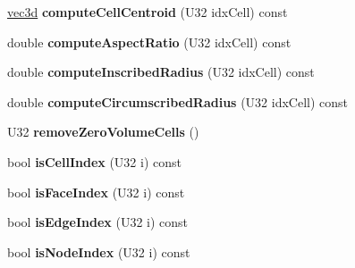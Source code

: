 \begin{DoxyCompactItemize}
\item 
\hypertarget{classps_1_1elastic_1_1VolMesh_af88b84f3c6a36015fd4d1b5b60a4f4b4}{}\hyperlink{classps_1_1base_1_1Vec3}{vec3d} {\bfseries compute\+Cell\+Centroid} (U32 idx\+Cell) const \label{classps_1_1elastic_1_1VolMesh_af88b84f3c6a36015fd4d1b5b60a4f4b4}

\item 
\hypertarget{classps_1_1elastic_1_1VolMesh_a799683f49aec6c0e6e70bc68f5e8a0b0}{}double {\bfseries compute\+Aspect\+Ratio} (U32 idx\+Cell) const \label{classps_1_1elastic_1_1VolMesh_a799683f49aec6c0e6e70bc68f5e8a0b0}

\item 
\hypertarget{classps_1_1elastic_1_1VolMesh_a1194410e557361559a0eb7ebde0270ee}{}double {\bfseries compute\+Inscribed\+Radius} (U32 idx\+Cell) const \label{classps_1_1elastic_1_1VolMesh_a1194410e557361559a0eb7ebde0270ee}

\item 
\hypertarget{classps_1_1elastic_1_1VolMesh_a9fdeddee8f948341861529a085be4299}{}double {\bfseries compute\+Circumscribed\+Radius} (U32 idx\+Cell) const \label{classps_1_1elastic_1_1VolMesh_a9fdeddee8f948341861529a085be4299}

\item 
\hypertarget{classps_1_1elastic_1_1VolMesh_a5f67ac6f5c6f41fb6e5725f34b94a333}{}U32 {\bfseries remove\+Zero\+Volume\+Cells} ()\label{classps_1_1elastic_1_1VolMesh_a5f67ac6f5c6f41fb6e5725f34b94a333}

\item 
\hypertarget{classps_1_1elastic_1_1VolMesh_adaf7ed1e46557f71b6d0c48c135303ff}{}bool {\bfseries is\+Cell\+Index} (U32 i) const \label{classps_1_1elastic_1_1VolMesh_adaf7ed1e46557f71b6d0c48c135303ff}

\item 
\hypertarget{classps_1_1elastic_1_1VolMesh_a24b73ef10efd1651eecf0a3431007083}{}bool {\bfseries is\+Face\+Index} (U32 i) const \label{classps_1_1elastic_1_1VolMesh_a24b73ef10efd1651eecf0a3431007083}

\item 
\hypertarget{classps_1_1elastic_1_1VolMesh_ae6d58ecf7f59e28da21b6eeb4b0afc57}{}bool {\bfseries is\+Edge\+Index} (U32 i) const \label{classps_1_1elastic_1_1VolMesh_ae6d58ecf7f59e28da21b6eeb4b0afc57}

\item 
\hypertarget{classps_1_1elastic_1_1VolMesh_acd4c370c20e0ab70e70439dac1ecb1e0}{}bool {\bfseries is\+Node\+Index} (U32 i) const \label{classps_1_1elastic_1_1VolMesh_acd4c370c20e0ab70e70439dac1ecb1e0}


\end{DoxyCompactItemize}
